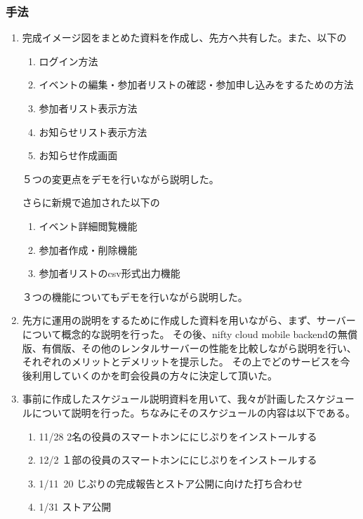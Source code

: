 \subsubsection{手法}
\begin{enumerate}
    \item 完成イメージ図をまとめた資料を作成し、先方へ共有した。また、以下の
    \begin{enumerate}
        \item ログイン方法
        \item イベントの編集・参加者リストの確認・参加申し込みをするための方法
        \item 参加者リスト表示方法
        \item お知らせリスト表示方法
        \item お知らせ作成画面
    \end{enumerate}
    ５つの変更点をデモを行いながら説明した。

    さらに新規で追加された以下の
    \begin{enumerate}
        \item イベント詳細閲覧機能
        \item 参加者作成・削除機能
        \item 参加者リストのcsv形式出力機能
    \end{enumerate}
    ３つの機能についてもデモを行いながら説明した。

    \item 先方に運用の説明をするために作成した資料を用いながら、まず、サーバーについて概念的な説明を行った。
    その後、nifty cloud mobile backendの無償版、有償版、その他のレンタルサーバーの性能を比較しながら説明を行い、それぞれのメリットとデメリットを提示した。
    その上でどのサービスを今後利用していくのかを町会役員の方々に決定して頂いた。

    \item 事前に作成したスケジュール説明資料を用いて、我々が計画したスケジュールについて説明を行った。ちなみにそのスケジュールの内容は以下である。
    \begin{enumerate}
        \item 11/28 2名の役員のスマートホンににじぷりをインストールする
        \item 12/2 １部の役員のスマートホンににじぷりをインストールする
        \item 1/11~20 じぷりの完成報告とストア公開に向けた打ち合わせ
        \item 1/31 ストア公開
    \end{enumerate}
\end{enumerate}


